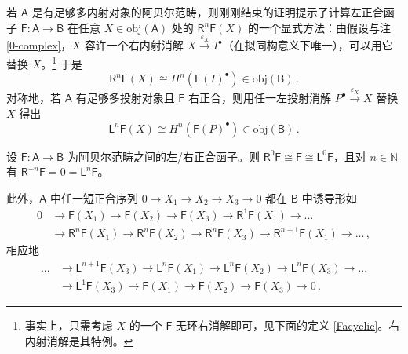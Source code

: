 \begin{Rem}\label{classicalderivedonresolutions}
	若 $\mathsf{A}$ 是有足够多内射对象的阿贝尔范畴，则刚刚结束的证明提示了计算左正合函子 $\mathsf{F}:\mathsf{A}\rightarrow\mathsf{B}$ 在任意 $X\in\text{obj}(\mathsf{A})$ 处的 $\mathsf{R}^n\mathsf{F}(X)$ 的一个显式方法：由假设与注 \ref{0-complex}，$X$ 容许一个右内射消解 $X\xrightarrow{\varepsilon_X}I^\bullet$（在拟同构意义下唯一），可以用它替换 $X$。\footnote{事实上，只需考虑 $X$ 的一个 $\mathsf{F}$-无环右消解即可，见下面的定义 \ref{Facyclic}。右内射消解是其特例。} 于是
	\begin{equation}\label{classderinjres}
		\mathsf{R}^n\mathsf{F}(X)\cong H^n(\mathsf{F}(I)^\bullet)\in\text{obj}(\mathsf{B})\,.
	\end{equation}
	对称地，若 $\mathsf{A}$ 有足够多投射对象且 $\mathsf{F}$ 右正合，则用任一左投射消解 $P^\bullet\xrightarrow{\varepsilon_X} X$ 替换 $X$ 得出
	\begin{equation}\label{classderprojres}
		\mathsf{L}^n\mathsf{F}(X)\cong H^n(\mathsf{F}(P)^\bullet)\in\text{obj}(\mathsf{B})\,.
	\end{equation}
\end{Rem}

\begin{Cor}\label{whenclassicalderivedtrivial}
	设 $\mathsf{F}:\mathsf{A}\rightarrow\mathsf{B}$ 为阿贝尔范畴之间的左/右正合函子。则 $\mathsf{R}^0\mathsf{F}\cong\mathsf{F}\cong\mathsf{L}^0\mathsf{F}$，且对 $n\in\mathbb{N}$ 有 $\mathsf{R}^{-n}\mathsf{F}=0=\mathsf{L}^n\mathsf{F}$。
	
	此外，$\mathsf{A}$ 中任一短正合序列 $0\rightarrow X_1\rightarrow X_2\rightarrow X_3\rightarrow 0$ 都在 $\mathsf{B}$ 中诱导形如
	\begin{align*}
		0&\rightarrow \mathsf{F}(X_1)\rightarrow \mathsf{F}(X_2)\rightarrow \mathsf{F}(X_3)\rightarrow \mathsf{R}^1\mathsf{F}(X_1)\rightarrow... \\
		&\rightarrow \mathsf{R}^n\mathsf{F}(X_1)\rightarrow \mathsf{R}^n\mathsf{F}(X_2)\rightarrow\mathsf{R}^n\mathsf{F}(X_3)\rightarrow \mathsf{R}^{n+1}\mathsf{F}(X_1)\rightarrow ...\,,  
	\end{align*}
	相应地
	\begin{align*}
		...&\rightarrow \mathsf{L}^{n+1}\mathsf{F}(X_3)\rightarrow \mathsf{L}^n\mathsf{F}(X_1)\rightarrow \mathsf{L}^n\mathsf{F}(X_2)\rightarrow\mathsf{L}^n\mathsf{F}(X_3)\rightarrow... \\
		&\rightarrow \mathsf{L}^1\mathsf{F}(X_3)\rightarrow \mathsf{F}(X_1)\rightarrow \mathsf{F}(X_2)\rightarrow \mathsf{F}(X_3)\rightarrow 0\,.  
	\end{align*}
\end{Cor}

